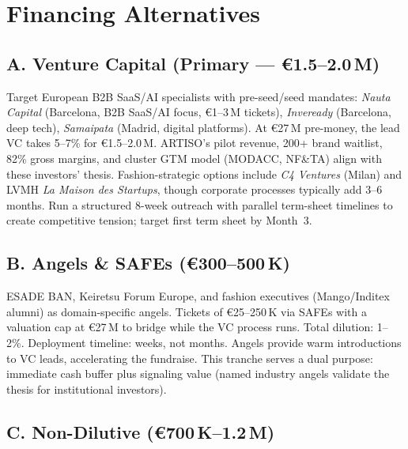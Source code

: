 \documentclass[11pt,a4paper]{article}
\begin{document}
\section{Financing Alternatives}

\subsection{A. Venture Capital (Primary --- \euro{}1.5--2.0\,M)}

Target European B2B SaaS/AI specialists with pre-seed/seed mandates: \textit{Nauta Capital} (Barcelona, B2B SaaS/AI focus, \euro{}1--3\,M tickets), \textit{Inveready} (Barcelona, deep tech), \textit{Samaipata} (Madrid, digital platforms). At \euro{}27\,M pre-money, the lead VC takes 5--7\% for \euro{}1.5--2.0\,M. ARTISO's pilot revenue, 200+ brand waitlist, 82\% gross margins, and cluster GTM model (MODACC, NF\&TA) align with these investors' thesis. Fashion-strategic options include \textit{C4 Ventures} (Milan) and LVMH \textit{La Maison des Startups}, though corporate processes typically add 3--6 months. Run a structured 8-week outreach with parallel term-sheet timelines to create competitive tension; target first term sheet by Month~3.

\subsection{B. Angels \& SAFEs (\euro{}300--500\,K)}

ESADE BAN, Keiretsu Forum Europe, and fashion executives (Mango/Inditex alumni) as domain-specific angels. Tickets of \euro{}25--250\,K via SAFEs with a valuation cap at \euro{}27\,M to bridge while the VC process runs. Total dilution: 1--2\%. Deployment timeline: weeks, not months. Angels provide warm introductions to VC leads, accelerating the fundraise. This tranche serves a dual purpose: immediate cash buffer plus signaling value (named industry angels validate the thesis for institutional investors).

\subsection{C. Non-Dilutive (\euro{}700\,K--1.2\,M)}
\end{document}
